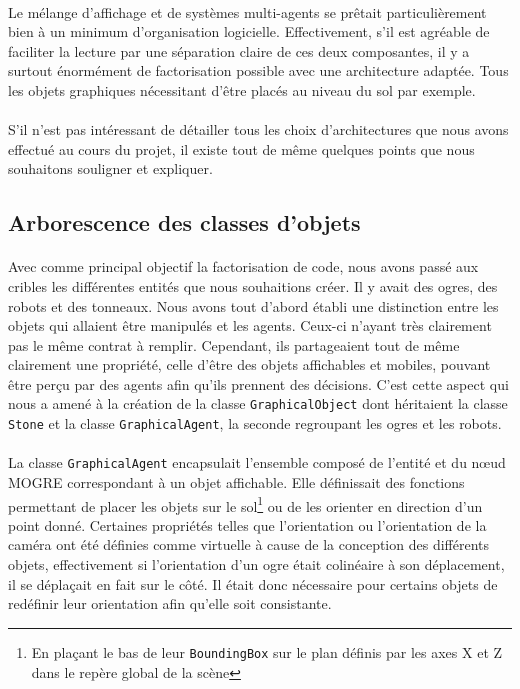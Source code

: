 \paragraph{}
Le mélange d'affichage et de systèmes multi-agents se prêtait particulièrement
bien à un minimum d'organisation logicielle. Effectivement, s'il est agréable
de faciliter la lecture par une séparation claire de ces deux composantes, il
y a surtout énormément de factorisation possible avec une architecture
adaptée. Tous les objets graphiques nécessitant d'être placés au niveau du sol
par exemple.

\paragraph{}
S'il n'est pas intéressant de détailler tous les choix d'architectures que
nous avons effectué au cours du projet, il existe tout de même quelques points
que nous souhaitons souligner et expliquer.

\subsection{Arborescence des classes d'objets}
\paragraph{}
Avec comme principal objectif la factorisation de code, nous avons passé aux
cribles les différentes entités que nous souhaitions créer. Il y avait des
ogres, des robots et des tonneaux. Nous avons tout d'abord établi une
distinction entre les objets qui allaient être manipulés et les agents.
Ceux-ci n'ayant très clairement pas le même contrat à remplir. Cependant, ils
partageaient tout de même clairement une propriété, celle d'être des objets
affichables et mobiles, pouvant être perçu par des agents afin qu'ils prennent
des décisions. C'est cette aspect qui nous a amené à la création de la classe
\verb!GraphicalObject! dont héritaient la classe \verb!Stone! et la classe
\verb!GraphicalAgent!,  la seconde regroupant les ogres et les robots.

\paragraph{}
La classe \verb!GraphicalAgent! encapsulait l'ensemble composé de l'entité et
du nœud MOGRE
correspondant à un objet affichable. Elle définissait des fonctions permettant
de placer les objets sur le sol\footnote{En plaçant le bas de leur
\verb!BoundingBox! sur le plan définis par les axes X et Z dans le repère
global de la scène} ou de les orienter en direction d'un point donné.
Certaines propriétés telles que l'orientation ou l'orientation de la caméra
ont été définies comme virtuelle à cause de la conception des différents
objets, effectivement si l'orientation d'un ogre était colinéaire à son
déplacement, il se déplaçait en fait sur le côté. Il était donc nécessaire
pour certains objets de redéfinir leur orientation afin qu'elle soit
consistante.

